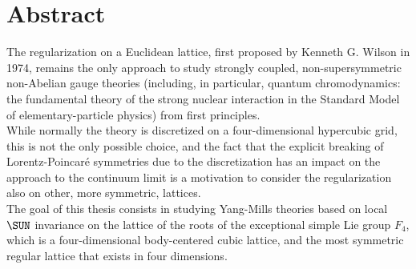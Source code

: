 \thispagestyle{empty}
\section*{Abstract}
The regularization on a Euclidean lattice, first proposed by Kenneth G. Wilson in 1974, remains the only approach to study strongly coupled, non-supersymmetric non-Abelian gauge theories (including, in particular, quantum chromodynamics: the fundamental theory of the strong nuclear interaction in the Standard Model of elementary-particle physics) from first principles.\\
While normally the theory is discretized on a four-dimensional hypercubic grid, this is not the only possible choice, and the fact that the explicit breaking of Lorentz-Poincaré symmetries due to the discretization has an impact on the approach to the continuum limit is a motivation to consider the regularization also on other, more symmetric, lattices.\\
The goal of this thesis consists in studying Yang-Mills theories based on local $\SUN$ invariance on the lattice of the roots of the exceptional simple Lie group $F_4$, which is a four-dimensional body-centered cubic lattice, and the most symmetric regular lattice that exists in four dimensions.
\cleardoublepage
